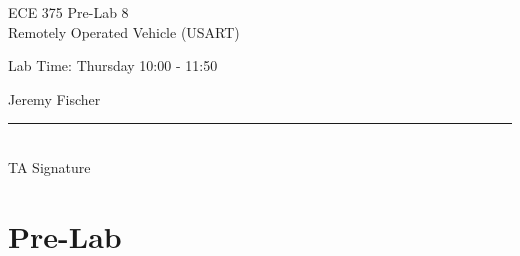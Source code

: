 \documentclass[12pt,letterpaper]{article}
\begin{document}
\begin{titlepage}
    \vspace*{4cm}
    \begin{flushright}
    {\huge
        ECE 375 Pre-Lab 8\\[1cm]
    }
    {\large
     	 Remotely Operated Vehicle (USART)
    }
    \end{flushright}
    \begin{flushleft}
    Lab Time: Thursday 10:00 - 11:50
    \end{flushleft}
    \begin{flushright}
    Jeremy Fischer
    
    \vfill
    \rule{5in}{.5mm}\\
    TA Signature
    \end{flushright}

\end{titlepage}


\section{Pre-Lab}
\end{document}

